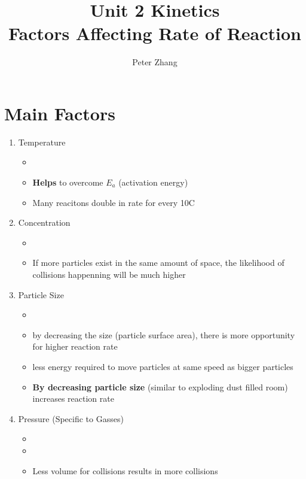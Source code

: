 \documentclass{article}
\title{Unit 2 Kinetics\\Factors Affecting Rate of Reaction}
\author{Peter Zhang}
\begin{document}
\maketitle
\newpage
\tableofcontents
\newpage


\section{Main Factors}
\begin{enumerate}
\item Temperature \begin{itemize} \item {} \item \textbf{Helps} to overcome $E_{a}$ (activation energy) \item Many reacitons double in rate for every 10C \end{itemize}

\item Concentration \begin{itemize} \item {} \item If more particles exist in the same amount of space, the likelihood of collisions happenning will be much higher \end{itemize}

\item Particle Size \begin{itemize} \item {} \item by decreasing the size (particle surface area), there is more opportunity for higher reaction rate \item less energy required to move particles at same speed as bigger particles \item \textbf{By decreasing particle size} (similar to exploding dust filled room) increases reaction rate \end{itemize}

\item Pressure (Specific to Gasses) \begin{itemize} \item {} \item {} \item Less volume for collisions results in more collisions \end{itemize}


\end{enumerate}
\end{document}
